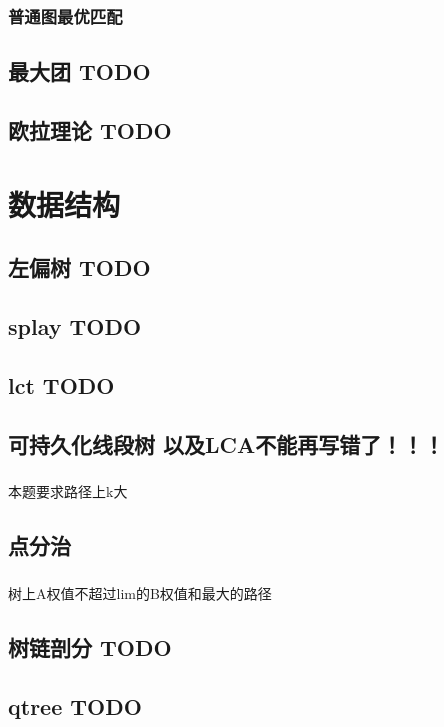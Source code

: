 \documentclass[landscape]{report}
\newcommand{\includecode}[2][c]{}
\begin{document}
\begin{flushleft}
\begin{multicols}{2}
\subsection{ 普通图最优匹配}
\includecode[c++]{uoj81.cpp}
\section{ 最大团 TODO}
\section{ 欧拉理论 TODO}


\chapter{数据结构}
\section{ 左偏树 TODO}
\section{splay TODO}
\section{lct TODO}
\section{可持久化线段树 以及LCA不能再写错了！！！}
\paragraph{ }
本题要求路径上k大
\includecode[c++]{COT.cpp}
\section{ 点分治}
\includecode[c++]{poj1741.cpp}
\paragraph{ }
树上A权值不超过lim的B权值和最大的路径
\includecode[c++]{poj1741.cpp}

\section{ 树链剖分 TODO}
\section{ qtree TODO}



\end{multicols}
\end{flushleft}
\end{document}
